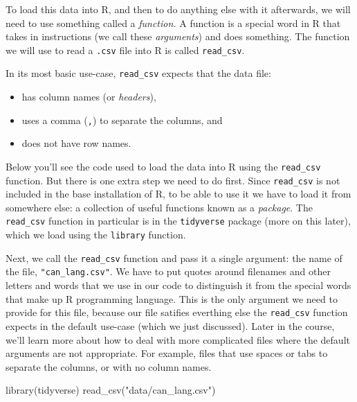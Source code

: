 \documentclass[
]{krantz}
\makeatletter
\newenvironment{Shaded}{\begin{snugshade}}{\end{snugshade}}
\newcommand{\FunctionTok}[1]{\textcolor[rgb]{0,0,0}{#1}}
\newcommand{\NormalTok}[1]{#1}
\newcommand{\StringTok}[1]{\textcolor[rgb]{0.5,0.5,0.5}{#1}}
\providecommand{\tightlist}{%
  \setlength{\itemsep}{0pt}\setlength{\parskip}{0pt}}
\newenvironment{kframe}{%
\medskip{}
\setlength{\fboxsep}{.8em}
 \def\at@end@of@kframe{}%
 \ifinner\ifhmode%
  \def\at@end@of@kframe{\end{minipage}}%
  \begin{minipage}{\columnwidth}%
 \fi\fi%
 \def\FrameCommand##1{\hskip\@totalleftmargin \hskip-\fboxsep
 \colorbox{shadecolor}{##1}\hskip-\fboxsep
     \hskip-\linewidth \hskip-\@totalleftmargin \hskip\columnwidth}%
 \MakeFramed {\advance\hsize-\width
   \@totalleftmargin\z@ \linewidth\hsize
   \@setminipage}}%
 {\par\unskip\endMakeFramed%
 \at@end@of@kframe}
\renewenvironment{Shaded}{\begin{kframe}}{\end{kframe}}
\makeatother
\begin{document}
To load this data into R, and then to do anything else with it afterwards, we will need to use something called a \emph{function.}
A function is a special word in R that takes in instructions (we call these \emph{arguments}) and does something. The function we will
use to read a \texttt{.csv} file into R is called \texttt{read\_csv}.

In its most basic use-case, \texttt{read\_csv} expects that the data file:

\begin{itemize}
\tightlist
\item
  has column names (or \emph{headers}),
\item
  uses a comma (\texttt{,}) to separate the columns, and
\item
  does not have row names.
\end{itemize}

Below you'll see the code used to load the data into R using the \texttt{read\_csv} function. But there is one extra step we need to do first. Since \texttt{read\_csv} is not included in the base installation of R,
to be able to use it we have to load it from somewhere else: a collection of useful functions known as a \emph{package}. The \texttt{read\_csv} function in particular
is in the \texttt{tidyverse} package (more on this later), which we load using the \texttt{library} function.

Next, we call the \texttt{read\_csv} function and pass it a single argument: the name of the file, \texttt{"can\_lang.csv"}. We have to put quotes around filenames and other letters and words that we
use in our code to distinguish it from the special words that make up R programming language. This is the only argument we need to provide for this file, because our file satifies everthing else
the \texttt{read\_csv} function expects in the default use-case (which we just discussed). Later in the course, we'll learn more about how to deal with more complicated files where the default arguments are not
appropriate. For example, files that use spaces or tabs to separate the columns, or with no column names.

\begin{Shaded}
\begin{Highlighting}[]
\FunctionTok{library}\NormalTok{(tidyverse)}
\FunctionTok{read\_csv}\NormalTok{(}\StringTok{"data/can\_lang.csv"}\NormalTok{)}
\end{Highlighting}
\end{Shaded}
\end{document}
